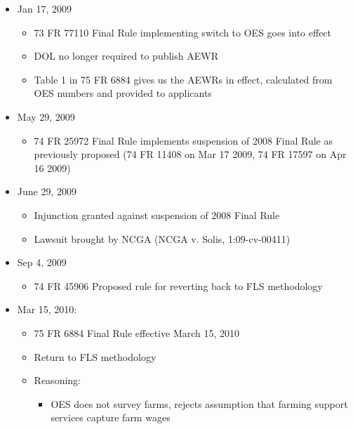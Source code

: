\documentclass[14pt]{article}
\begin{document}
\begin{itemize}
\begin{itemize}
\begin{itemize}
			            \item OES is calculated at finer occupational and geographic granularity, so higher accuracy of estimated prevailing wage
			            \item More predictable budgeting by fixing contract wage at time contract signed, rather than adjusting with time work performed as under AEWR rule
		            \end{itemize}
	      \end{itemize}
	\item Jan 17, 2009
	      \begin{itemize}
		      \item 73 FR 77110 Final Rule implementing switch to OES goes into effect
		      \item DOL no longer required to publish AEWR
		      \item Table 1 in 75 FR 6884 gives us the AEWRs in effect, calculated from OES numbers and provided to applicants
	      \end{itemize}
	\item May 29, 2009
	      \begin{itemize}
		      \item 74 FR 25972 Final Rule implements suspension of 2008 Final Rule as previously proposed (74 FR 11408 on Mar 17 2009, 74 FR 17597 on Apr 16 2009)
	      \end{itemize}
	\item June 29, 2009
	      \begin{itemize}
		      \item Injunction granted against suspension of 2008 Final Rule
		      \item Lawsuit brought by NCGA (NCGA v. Solis, 1:09-cv-00411)
	      \end{itemize}
	\item Sep 4, 2009
	      \begin{itemize}
		      \item 74 FR 45906 Proposed rule for reverting back to FLS methodology
	      \end{itemize}
	\item Mar 15, 2010:
	      \begin{itemize}
		      \item 75 FR 6884 Final Rule effective March 15, 2010
		      \item Return to FLS methodology
		      \item Reasoning:
		            \begin{itemize}
			            \item OES does not survey farms, rejects assumption that farming support services capture farm wages

\end{itemize}
\end{itemize}
\end{itemize}
\end{document}
